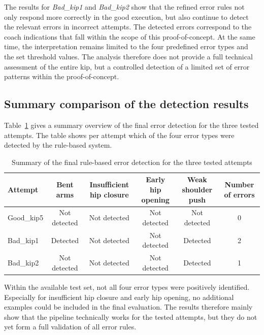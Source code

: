 The results for \textit{Bad\_kip1} and \textit{Bad\_kip2} show that the refined error rules not only respond more correctly in the good execution, but also continue to detect the relevant errors in incorrect attempts. The detected errors correspond to the coach indications that fall within the scope of this proof-of-concept. At the same time, the interpretation remains limited to the four predefined error types and the set threshold values. The analysis therefore does not provide a full technical assessment of the entire kip, but a controlled detection of a limited set of error patterns within the proof-of-concept.

\subsection{Summary comparison of the detection results}

Table~\ref{tab:final_detection_results} gives a summary overview of the final error detection for the three tested attempts. The table shows per attempt which of the four error types were detected by the rule-based system.

\begin{table}[H]
    \centering
    \scriptsize
    \begin{tabular}{lccccc}
        \toprule
        \textbf{Attempt} & \textbf{Bent arms} & \textbf{Insufficient hip closure} & \textbf{Early hip opening} & \textbf{Weak shoulder push} & \textbf{Number of errors} \\
        \midrule
        Good\_kip5 & Not detected & Not detected & Not detected & Not detected & 0 \\
        Bad\_kip1 & Detected & Not detected & Not detected & Detected & 2 \\
        Bad\_kip2 & Not detected & Not detected & Not detected & Detected & 1 \\
        \bottomrule
    \end{tabular}
    \caption{Summary of the final rule-based error detection for the three tested attempts}
    \label{tab:final_detection_results}
\end{table}

Within the available test set, not all four error types were positively identified. Especially for insufficient hip closure and early hip opening, no additional examples could be included in the final evaluation. The results therefore mainly show that the pipeline technically works for the tested attempts, but they do not yet form a full validation of all error rules.

